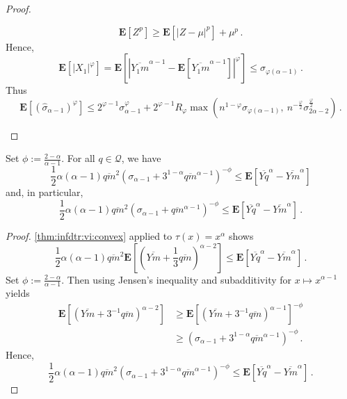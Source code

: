 \documentclass{article}
\newcommand*{\mc}[1]{\mathcal{#1}}
\newcommand{\lab}{\left[} %
\newcommand{\rab}{\right]} %
\newcommand{\ab}[1]{\lab #1 \rab} %
\newcommand{\abOf}[1]{\!\ab{#1}} %
\newcommand{\lb}{\left(} %
\newcommand{\rb}{\right)} %
\newcommand{\br}[1]{\lb #1 \rb} %
\newcommand{\brOf}[1]{\!\br{#1}} %
\newcommand{\absOf}[1]{\left\vert #1 \right\vert} %
\newcommand{\E}{\mathbf{E}} %
\newcommand{\EOf}[1]{\E\abOf{#1}}
\newcommand{\eqfs}{\,.}
\newcommand{\ol}[2]{\overline{#1#2}}
\newcommand{\tran}{\tau}
\begin{document}
\begin{proof}
\begin{enumerate}[label=(\roman*)]
\begin{equation}
				\EOf{Z^p} \geq \EOf{|Z-\mu|^p} + \mu^p
				\eqfs
			\end{equation}
			Hence,
			\begin{equation}
				\EOf{|X_1|^\varphi}
				=
				\EOf{\absOf{\ol{Y_1}{m}^{\alpha-1} - \EOf{\ol{Y_1}{m}^{\alpha-1}}}^\varphi}
				\leq
				\sigma_{\varphi(\alpha-1)}
				\eqfs
			\end{equation}
			Thus
			\begin{equation}
				\EOf{\br{\hat\sigma_{\alpha-1}}^{\varphi}}
				\leq 
				2^{\varphi-1} \sigma_{\alpha-1}^{\varphi} + 2^{\varphi-1} R_\varphi \max\brOf{ n^{1-\varphi} \sigma_{\varphi(\alpha-1)},\ n^{-\frac{\varphi}{2}} \sigma_{2\alpha-2}^{\frac{\varphi}{2}}}
				\eqfs
			\end{equation}
	\end{enumerate}
\end{proof}
%
\begin{lemma}\label{lmm:power:vi}
    Set $\phi := \frac{2-\alpha}{\alpha-1}$.
	For all $q\in\mc Q$, we have 
	\begin{equation}
		\frac12 \alpha (\alpha-1) \ol{q}{m}^2 \br{\sigma_{\alpha-1} + 3^{1-\alpha}\ol{q}{m}^{\alpha-1}}^{-\phi} \leq \EOf{\ol Yq^\alpha - \ol Y{m}^\alpha}
	\end{equation}
    and, in particular,
    \begin{equation}
        \frac12 \alpha (\alpha-1) \ol{q}{m}^2 \br{\sigma_{\alpha-1} + \ol{q}{m}^{\alpha-1}}^{-\phi} \leq \EOf{\ol Yq^\alpha - \ol Y{m}^\alpha}
        \eqfs
    \end{equation}
\end{lemma}
%
\begin{proof}
	 \ref{thm:infdtr:vi:convex} applied to $\tran(x) = x^\alpha$ shows
	\begin{equation}
		\frac12 \alpha (\alpha-1) \ol{q}{m}^2 \EOf{\br{\ol Y{m}+\frac13\ol q{m}}^{\alpha-2}}  \leq \EOf{\ol Yq^\alpha - \ol Y{m}^\alpha}
		\eqfs
	\end{equation}
	Set $\phi := \frac{2-\alpha}{\alpha-1}$. Then using Jensen's inequality and subadditivity for $x\mapsto x^{\alpha-1}$ yields
	\begin{align}
		\EOf{\br{\ol Y{m} + 3^{-1}\ol q{m}}^{\alpha-2}}
		&\geq 
		\EOf{\br{\ol Y{m} + 3^{-1}\ol{q}{m}}^{\alpha-1}}^{-\phi}
		\\&\geq
		\br{\sigma_{\alpha-1} + 3^{1-\alpha}\ol{q}{m}^{\alpha-1}}^{-\phi}
		\eqfs
	\end{align}
	Hence,
	\begin{equation}
		\frac12 \alpha (\alpha-1) \ol{q}{m}^2 \br{\sigma_{\alpha-1} + 3^{1-\alpha}\ol{q}{m}^{\alpha-1}}^{-\phi} \leq \EOf{\ol Yq^\alpha - \ol Y{m}^\alpha}
		\eqfs
	\end{equation}
\end{proof}
\end{document}
